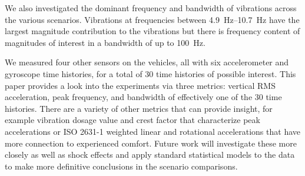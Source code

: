 \documentclass[a4paper]{article}
\begin{document}
We also investigated the dominant frequency and bandwidth of vibrations across
the various scenarios. Vibrations at frequencies between
\SIrange{4.9}{10.7}{\hertz} have the largest magnitude contribution to the
vibrations but there is frequency content of magnitudes of interest in a
bandwidth of up to 100~\si{\hertz}.

We measured four other sensors on the vehicles, all with six accelerometer and
gyroscope time histories, for a total of 30 time histories of possible interest.
This paper provides a look into the experiments via three metrics: vertical RMS
acceleration, peak frequency, and bandwidth of effectively one of the 30 time
histories. There are a variety of other metrics that can provide insight, for
example vibration dosage value and crest factor that characterize peak
accelerations or ISO 2631-1 weighted linear and rotational accelerations that
have more connection to experienced comfort. Future work will investigate these
more closely as well as shock effects and apply standard statistical models to
the data to make more definitive conclusions in the scenario comparisons.



\end{document}
